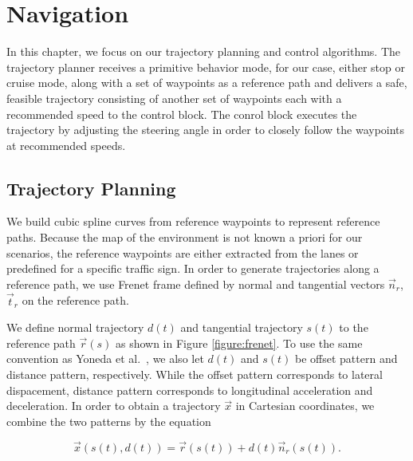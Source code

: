 \chapter{Navigation}
\label{chp:b5}

In this chapter, we focus on our trajectory planning and control algorithms.
The trajectory planner receives a primitive behavior mode, for our case, either
stop or cruise mode, along with a set of waypoints as a reference path and
delivers a safe, feasible trajectory consisting of another set of waypoints
each with a recommended speed to the control block. The conrol block executes
the trajectory by adjusting the steering angle in order to closely follow the
waypoints at recommended speeds.

\section{Trajectory Planning}

We build cubic spline curves from reference waypoints to represent reference
paths. Because the map of the environment is not known a priori for our
scenarios, the reference waypoints are either extracted from the lanes or
predefined for a specific traffic sign. In order to generate trajectories
along a reference path, we use Frenet frame \cite{Werling2010OptimalTG,
Yoneda2018TrajectoryOA} defined by normal and tangential vectors $\vec{n}_r$,
$\vec{t}_r$ on the reference path.

We define normal trajectory $d(t)$ and tangential trajectory $s(t)$ to the
reference path $\vec{r}(s)$ as shown in Figure \ref{figure:frenet}. To use the
same convention as Yoneda et al.\ \cite{Yoneda2018TrajectoryOA}, we also let
$d(t)$ and $s(t)$ be offset pattern and distance pattern, respectively. While
the offset pattern corresponds to lateral dispacement, distance pattern
corresponds to longitudinal acceleration and deceleration. In order to obtain a
trajectory $\vec{x}$ in Cartesian coordinates, we combine the two patterns by
the equation

\begin{equation}
  \vec{x}(s(t), d(t)) = \vec{r}(s(t)) + d(t)\vec{n}_r(s(t)).
  \label{eq:trajectory}
\end{equation}

